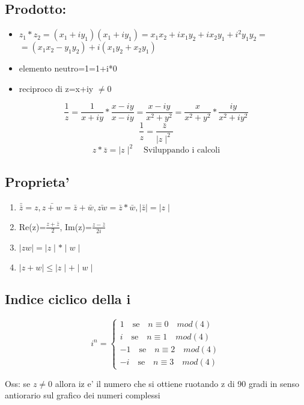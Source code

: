 \documentclass{article}
\begin{document}
          \subsection*{Prodotto:}
          \begin{itemize}
            \item $z_1*z_2=(x_1+iy_1)(x_1+iy_1)=x_1x_2+ix_1y_2+ix_2y_1+i^2y_1y_2=$ \\
              $=(x_1x_2-y_1y_2)+i(x_1y_2+x_2y_1)$
            \item elemento neutro=1=1+i*0
            \item reciproco di z=x+iy $\neq$0
          \end{itemize}
          \begin{equation*}
            \frac{1}{z}=\frac{1}{x+iy}*\frac{x-iy}{x-iy}=\frac{x-iy}{x^2+y^2}=\frac{x}{x^2+y^2}*\frac{iy}{x^2+iy^2}
          \end{equation*}
          \begin{equation*}
            \frac{1}{z}=\frac{\bar{z}}{\mid z \mid ^2}
          \end{equation*}
          \begin{equation*}
            z*\bar{z}=\mid z \mid ^2 \quad \text{Sviluppando i calcoli}
          \end{equation*}
          \subsection{Proprieta'}
          \begin{enumerate}
            \item $\bar{\bar{z}}=z,\bar{z+w}=\bar{z}+\bar{w},\bar{zw}=\bar{z}*\bar{w},\mid \bar{z}\mid = \mid z \mid$
            \item Re(z)=$\frac{z+\bar{z}}{2}$, Im(z)=$\frac{z-\bar{z}}{2i}$
            \item $\mid zw \mid=\mid z \mid * \mid w \mid$
            \item $\mid z+w \mid \leq \mid z \mid + \mid w \mid$
          \end{enumerate}
          \subsection*{Indice ciclico della i}
          \begin{equation*}
            i^n=
            \begin{cases}
              1 \quad \text{se} \quad n \equiv 0 \quad mod(4)\\
              i \quad \text{se} \quad n \equiv 1 \quad mod(4)\\
              -1 \quad \text{se} \quad n \equiv 2 \quad mod(4)\\
              -i \quad \text{se} \quad n \equiv 3 \quad mod(4)
            \end{cases}
          \end{equation*}
          \begin{flushleft}
            Oss: se $z\neq 0$ allora iz e' il numero che si ottiene ruotando z di 90 gradi in senso antiorario sul grafico dei numeri complessi
          \end{flushleft}
\end{document}
